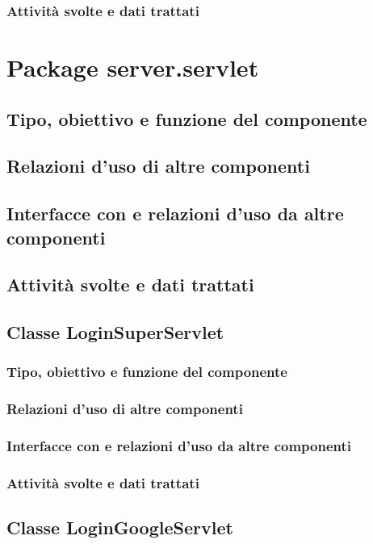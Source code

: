 \subsubsection*{Attivit\`a svolte e dati trattati}

\newpage
\section{Package server.servlet} %
\subsection*{Tipo, obiettivo e funzione del componente}
\subsection*{Relazioni d'uso di altre componenti}
\subsection*{Interfacce con e relazioni d'uso da altre componenti}
\subsection*{Attivit\`a svolte e dati trattati}

\subsection{Classe LoginSuperServlet}
\subsubsection*{Tipo, obiettivo e funzione del componente}
\subsubsection*{Relazioni d'uso di altre componenti}
\subsubsection*{Interfacce con e relazioni d'uso da altre componenti}
\subsubsection*{Attivit\`a svolte e dati trattati}

\subsection{Classe LoginGoogleServlet}
